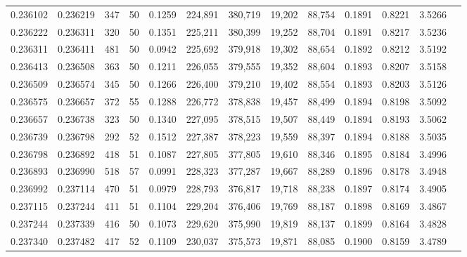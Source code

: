 \begin{tabular}{rrrrrrrrrrrrr}
0.236102 & 0.236219 &   347 &  50 &                                     0.1259 & 224,891 & 380,719 &  19,202 &  88,754 & 0.1891 & 0.8221 & 3.5266 \\
0.236222 & 0.236311 &   320 &  50 &                                     0.1351 & 225,211 & 380,399 &  19,252 &  88,704 & 0.1891 & 0.8217 & 3.5236 \\
0.236311 & 0.236411 &   481 &  50 &                                     0.0942 & 225,692 & 379,918 &  19,302 &  88,654 & 0.1892 & 0.8212 & 3.5192 \\
0.236413 & 0.236508 &   363 &  50 &                                     0.1211 & 226,055 & 379,555 &  19,352 &  88,604 & 0.1893 & 0.8207 & 3.5158 \\
0.236509 & 0.236574 &   345 &  50 &                                     0.1266 & 226,400 & 379,210 &  19,402 &  88,554 & 0.1893 & 0.8203 & 3.5126 \\
0.236575 & 0.236657 &   372 &  55 &                                     0.1288 & 226,772 & 378,838 &  19,457 &  88,499 & 0.1894 & 0.8198 & 3.5092 \\
0.236657 & 0.236738 &   323 &  50 &                                     0.1340 & 227,095 & 378,515 &  19,507 &  88,449 & 0.1894 & 0.8193 & 3.5062 \\
0.236739 & 0.236798 &   292 &  52 &                                     0.1512 & 227,387 & 378,223 &  19,559 &  88,397 & 0.1894 & 0.8188 & 3.5035 \\
0.236798 & 0.236892 &   418 &  51 &                                     0.1087 & 227,805 & 377,805 &  19,610 &  88,346 & 0.1895 & 0.8184 & 3.4996 \\
0.236893 & 0.236990 &   518 &  57 &                                     0.0991 & 228,323 & 377,287 &  19,667 &  88,289 & 0.1896 & 0.8178 & 3.4948 \\
0.236992 & 0.237114 &   470 &  51 &                                     0.0979 & 228,793 & 376,817 &  19,718 &  88,238 & 0.1897 & 0.8174 & 3.4905 \\
0.237115 & 0.237244 &   411 &  51 &                                     0.1104 & 229,204 & 376,406 &  19,769 &  88,187 & 0.1898 & 0.8169 & 3.4867 \\
0.237244 & 0.237339 &   416 &  50 &                                     0.1073 & 229,620 & 375,990 &  19,819 &  88,137 & 0.1899 & 0.8164 & 3.4828 \\
0.237340 & 0.237482 &   417 &  52 &                                     0.1109 & 230,037 & 375,573 &  19,871 &  88,085 & 0.1900 & 0.8159 & 3.4789 \\

\end{tabular}
